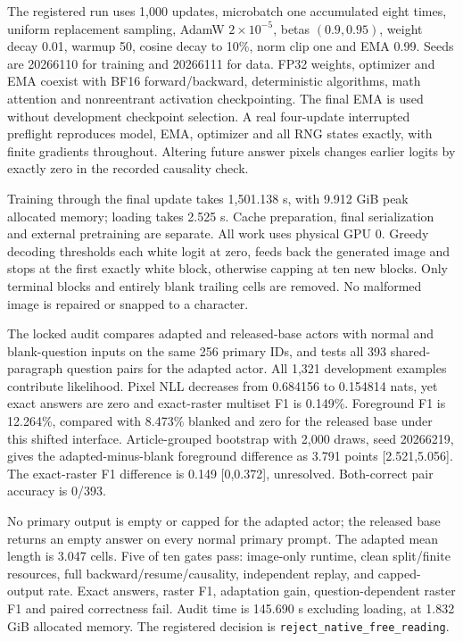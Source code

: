 \documentclass[10pt,a4paper]{article}
\begin{document}
The registered run uses 1,000 updates, microbatch one accumulated eight times,
uniform replacement sampling, AdamW $2\times10^{-5}$, betas $(0.9,0.95)$,
weight decay 0.01, warmup 50, cosine decay to 10\%, norm clip one and EMA
0.99. Seeds are 20266110 for training and 20266111 for data. FP32 weights,
optimizer and EMA coexist with BF16 forward/backward, deterministic algorithms,
math attention and nonreentrant activation checkpointing. The final EMA is
used without development checkpoint selection. A real four-update interrupted
preflight reproduces model, EMA, optimizer and all RNG states exactly, with
finite gradients throughout. Altering future answer pixels changes earlier
logits by exactly zero in the recorded causality check.

Training through the final update takes 1,501.138 s, with 9.912 GiB peak
allocated memory; loading takes 2.525 s. Cache preparation, final serialization
and external pretraining are separate. All work uses physical GPU 0. Greedy
decoding thresholds each white logit at zero, feeds back the generated image
and stops at the first exactly white block, otherwise capping at ten new
blocks. Only terminal blocks and entirely blank trailing cells are removed.
No malformed image is repaired or snapped to a character.

The locked audit compares adapted and released-base actors with normal and
blank-question inputs on the same 256 primary IDs, and tests all 393
shared-paragraph question pairs for the adapted actor. All 1,321 development
examples contribute likelihood. Pixel NLL decreases from 0.684156 to
0.154814 nats, yet exact answers are zero and exact-raster multiset F1 is
0.149\%. Foreground F1 is 12.264\%, compared with 8.473\% blanked and zero
for the released base under this shifted interface. Article-grouped bootstrap
with 2,000 draws, seed 20266219, gives the adapted-minus-blank foreground
difference as 3.791 points [2.521,5.056]. The exact-raster F1 difference is
0.149 [0,0.372], unresolved. Both-correct pair accuracy is 0/393.

No primary output is empty or capped for the adapted actor; the released base
returns an empty answer on every normal primary prompt. The adapted mean
length is 3.047 cells. Five of ten gates pass: image-only runtime, clean
split/finite resources, full backward/resume/causality, independent replay,
and capped-output rate. Exact answers, raster F1, adaptation gain,
question-dependent raster F1 and paired correctness fail. Audit time is
145.690 s excluding loading, at 1.832 GiB allocated memory. The registered
decision is \texttt{reject\_native\_free\_reading}.
\end{document}
